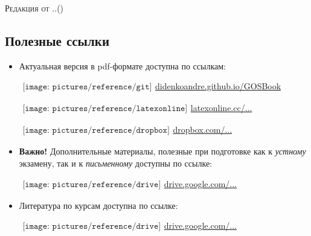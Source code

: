 {\LARGE\scshape Редакция от \twodigit\day.\twodigit\month.\the\year \;(\currenttime)}\par 

\vspace*{-1\baselineskip}  
\begin{flushleft}
\section*{\Large Полезные ссылки}
\begin{itemize}[wide, labelwidth=!, labelindent=0pt, label=$\blacktriangleright$, noitemsep]
\item Актуальная версия в pdf-формате доступна по ссылкам:

\qquad\href{https://didenkoandre.github.io/GOSBook}{$
\begin{array}{l}
\texttt{[image: pictures/reference/git]}
\end{array}
$\large didenkoandre.github.io/GOSBook}

\qquad\href{http://latexonline.cc/compile?git=https://github.com/DidenkoAndre/GOSBook&target=GOSBook.tex&download=GOSBook.pdf&command=pdflatex}{$
\begin{array}{l}
\texttt{[image: pictures/reference/latexonline]}
\end{array}
$\large latexonline.cc/...}

\qquad\href{https://www.dropbox.com/s/nly4ewbfcyrc8es/GOSBook.pdf?dl=0}{$
\begin{array}{l}
\texttt{[image: pictures/reference/dropbox]}
\end{array}
$\large dropbox.com/...}

\item \textbf{Важно!} Дополнительные материалы, полезные при подготовке как к \textit{устному} экзамену, так и к \textit{письменному} доступны по ссылке:

\qquad\href{https://drive.google.com/drive/u/0/folders/0BzuzEyNkpwYDYjVNcE0wa3hqWjA}{$
\begin{array}{l}
\texttt{[image: pictures/reference/drive]}
\end{array}
$\large drive.google.com/...}

\item Литература по курсам доступна по ссылке:

\qquad\href{https://drive.google.com/drive/u/0/folders/0BzuzEyNkpwYDcENXcV9jNWdwVlU}{$
\begin{array}{l}
\texttt{[image: pictures/reference/drive]}
\end{array}
$\large drive.google.com/...}


\end{itemize}
\end{flushleft}
